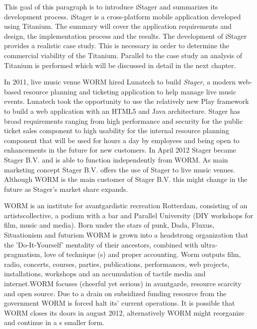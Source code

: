 This goal of this paragraph is to introduce iStager and summarizes its development process. iStager is a cross-platform mobile application developed using Titanium. The summary will cover the application requirements and design, the implementation process and the results. 
The development of iStager provides a realistic case study. This is necessary in order to determine the commercial viability of the Titanium. Parallel to the case study an analysis of Titanium is performed which will be discussed in detail in the next chapter.






In 2011, live music venue WORM hired Lunatech to build \emph{Stager}, a modern web-based resource planning and ticketing application to help manage live music events. Lunatech took the opportunity to use the relatively new Play framework to build a web application with an HTML5 and Java architecture. Stager has broad requirements ranging from high performance and security for the public ticket sales component to high usability for the internal resource planning component that will be used for hours a day by employees and being open to enhancements in the future for new customers. \cite{Lunatech2011} In April 2012 Stager became Stager B.V. and is able to function independently from WORM. As main marketing concept Stager B.V. offers the use of Stager  to live music venues. Although WORM is the main customer of Stager B.V. this might change in the future as Stager's market share expands. 

WORM is an institute for avantgardistic recreation Rotterdam, consisting of an artistscollective, a podium with a bar and Parallel University (DIY workshops for film, music and media). Born under the stars of punk, Dada, Fluxus, Situationism and futurism WORM is grown into a headstrong organization that the 'Do-It-Yourself' mentality of their ancestors, combined with ultra-pragmatism, love of technique (s) and proper accounting. Worm outputs film, radio, concerts, courses, parties, publications, performances, web projects, installations, workshops and an accumulation of tactile media and internet.WORM focuses (cheerful yet serious) in avantgarde, resource scarcity and open source. \cite{WORM2012} Due to a drain on subsidized funding resource from the government WORM is forced halt its' current operations. It is possible that WORM closes its doors in august 2012, alternatively WORM might reorganize and continue in a s smaller form.


